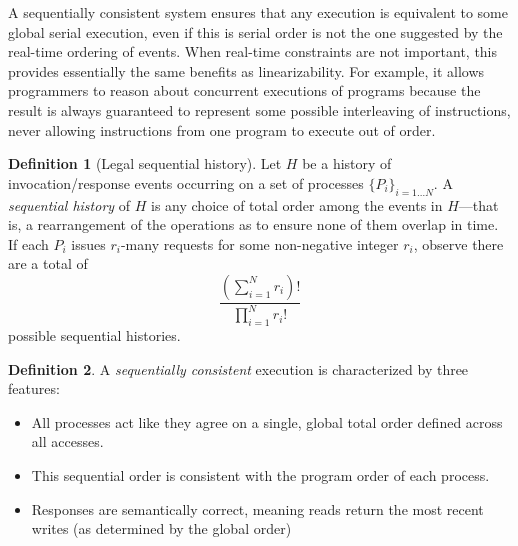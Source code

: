 \documentclass[]             %
{NASA}                       %
\theoremstyle{definition}
\newtheorem{definition}{Definition}[section]
\begin{document}
A sequentially consistent system ensures that any execution is
equivalent to some global serial execution, even if this is serial order
is not the one suggested by the real-time ordering of events. When
real-time constraints are not important, this provides essentially the
same benefits as linearizability. For example, it allows programmers to
reason about concurrent executions of programs because the result is
always guaranteed to represent some possible interleaving of
instructions, never allowing instructions from one program to execute
out of order.

\begin{definition}[Legal sequential history]
Let $H$ be a history of invocation/response events occurring on a set
of processes $\{P_i\}_{i = 1 \ldots N}$. A \emph{sequential history}
of $H$ is any choice of total order among the events in $H$---that is,
a rearrangement of the operations as to ensure none of them overlap in
time. If each $P_i$ issues
$r_i$-many requests for some non-negative integer $r_i$, observe there
are a total of
\[
\frac{\left(\sum_{i = 1}^N r_i\right)!}{\prod_{i = 1}^N r_i!}
\]
possible sequential histories.
\end{definition}

\begin{definition}
  \label{def:sequentiallyconsistent}
  A \emph{sequentially consistent} execution is
  characterized by three features:
  \begin{itemize}
  \item All processes act like they agree on a single, global total order
    defined across all accesses.
  \item This sequential order is consistent with the program order of each process.
  \item Responses are semantically correct, meaning reads return the most recent writes (as determined by the global order)
  \end{itemize}
\end{definition}
\end{document}
